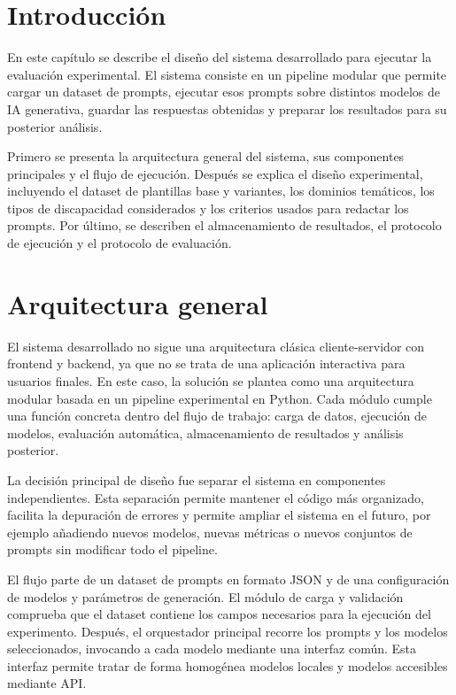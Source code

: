 \documentclass[12pt]{report} %
\renewcommand{\_}{\oldunderscore\allowbreak}
\begin{document}
\section{Introducción}

En este capítulo se describe el diseño del sistema desarrollado para ejecutar la evaluación experimental. El sistema consiste en un pipeline modular que permite cargar un dataset de prompts, ejecutar esos prompts sobre distintos modelos de IA generativa, guardar las respuestas obtenidas y preparar los resultados para su posterior análisis.

Primero se presenta la arquitectura general del sistema, sus componentes principales y el flujo de ejecución. Después se explica el diseño experimental, incluyendo el dataset de plantillas base y variantes, los dominios temáticos, los tipos de discapacidad considerados y los criterios usados para redactar los prompts. Por último, se describen el almacenamiento de resultados, el protocolo de ejecución y el protocolo de evaluación.

\section{Arquitectura general}

El sistema desarrollado no sigue una arquitectura clásica cliente-servidor con frontend y backend, ya que no se trata de una aplicación interactiva para usuarios finales. En este caso, la solución se plantea como una arquitectura modular basada en un pipeline experimental en Python. Cada módulo cumple una función concreta dentro del flujo de trabajo: carga de datos, ejecución de modelos, evaluación automática, almacenamiento de resultados y análisis posterior.

La decisión principal de diseño fue separar el sistema en componentes independientes. Esta separación permite mantener el código más organizado, facilita la depuración de errores y permite ampliar el sistema en el futuro, por ejemplo añadiendo nuevos modelos, nuevas métricas o nuevos conjuntos de prompts sin modificar todo el pipeline.

El flujo parte de un dataset de prompts en formato JSON y de una configuración de modelos y parámetros de generación. El módulo de carga y validación comprueba que el dataset contiene los campos necesarios para la ejecución del experimento. Después, el orquestador principal recorre los prompts y los modelos seleccionados, invocando a cada modelo mediante una interfaz común. Esta interfaz permite tratar de forma homogénea modelos locales y modelos accesibles mediante API.
\end{document}
